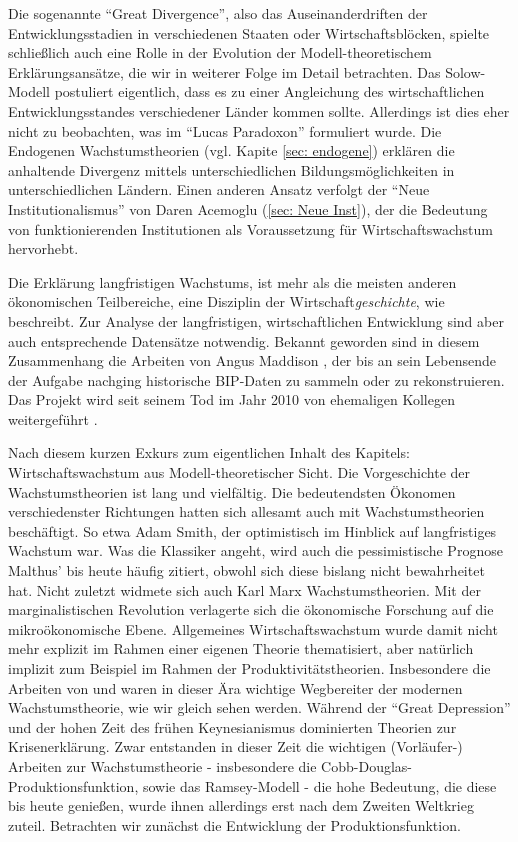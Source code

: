 Die sogenannte "`Great Divergence"', also das Auseinanderdriften der Entwicklungsstadien in verschiedenen Staaten oder Wirtschaftsblöcken, spielte schließlich auch eine Rolle in der Evolution der Modell-theoretischem Erklärungsansätze, die wir in weiterer Folge im Detail betrachten. Das Solow-Modell postuliert eigentlich, dass es zu einer Angleichung des wirtschaftlichen Entwicklungsstandes verschiedener Länder kommen sollte. Allerdings ist dies eher nicht zu beobachten, was im "`Lucas Paradoxon"' formuliert wurde. Die Endogenen Wachstumstheorien (vgl. Kapite \ref{sec: endogene}) erklären die anhaltende Divergenz mittels unterschiedlichen Bildungsmöglichkeiten in unterschiedlichen Ländern. Einen anderen Ansatz verfolgt der "`Neue Institutionalismus"' von Daren Acemoglu (\ref{sec: Neue Inst}), der die Bedeutung von funktionierenden Institutionen als Voraussetzung für Wirtschaftswachstum hervorhebt. 

Die Erklärung langfristigen Wachstums, ist mehr als die meisten anderen ökonomischen Teilbereiche, eine Disziplin der Wirtschaft\textit{geschichte}, wie \textcite{Baumol1986} beschreibt. Zur Analyse der langfristigen, wirtschaftlichen Entwicklung sind aber auch entsprechende Datensätze notwendig. Bekannt geworden sind in diesem Zusammenhang die Arbeiten von Angus Maddison \parencite{Maddison2010}, der bis an sein Lebensende der Aufgabe nachging historische BIP-Daten zu sammeln oder zu rekonstruieren. Das Projekt wird seit seinem Tod im Jahr 2010 von ehemaligen Kollegen weitergeführt \parencite{Maddison2023}.

Nach diesem kurzen Exkurs zum eigentlichen Inhalt des Kapitels: Wirtschaftswachstum aus Modell-theoretischer Sicht. Die Vorgeschichte der Wachstumstheorien ist lang und vielfältig. Die bedeutendsten Ökonomen verschiedenster Richtungen hatten sich allesamt auch mit Wachstumstheorien beschäftigt. So etwa Adam Smith, der optimistisch im Hinblick auf langfristiges Wachstum war. Was die Klassiker angeht, wird auch die pessimistische Prognose Malthus' bis heute häufig zitiert, obwohl sich diese bislang nicht bewahrheitet hat. Nicht zuletzt widmete sich auch Karl Marx Wachstumstheorien. Mit der marginalistischen Revolution verlagerte sich die ökonomische Forschung auf die mikroökonomische Ebene. Allgemeines Wirtschaftswachstum wurde damit nicht mehr explizit im Rahmen einer eigenen Theorie thematisiert, aber natürlich implizit zum Beispiel im Rahmen der Produktivitätstheorien. Insbesondere die Arbeiten von \textcite{Wicksteed1894} und \textcite{Wicksell1922} waren in dieser Ära wichtige Wegbereiter der modernen Wachstumstheorie, wie wir gleich sehen werden. Während der "`Great Depression"' und der hohen Zeit des frühen Keynesianismus dominierten Theorien zur Krisenerklärung. Zwar entstanden in dieser Zeit die wichtigen (Vorläufer-) Arbeiten zur Wachstumstheorie - insbesondere die Cobb-Douglas-Produktionsfunktion, sowie das Ramsey-Modell - die hohe Bedeutung, die diese bis heute genießen, wurde ihnen allerdings erst nach dem Zweiten Weltkrieg zuteil. Betrachten wir zunächst die Entwicklung der Produktionsfunktion.

